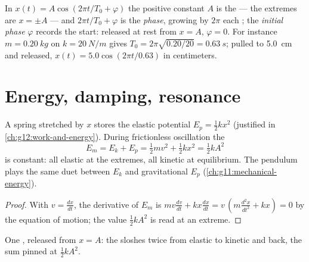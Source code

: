 \begin{definition}\label{def:g12:oscillators-and-time:phase}
In $x(t) = A\cos(2\pi t/T_0 + \varphi)$ the positive constant $A$ is
the  --- the extremes are $x = \pm A$ --- and $2\pi t/T_0 +
\varphi$ is the \emph{phase}, growing by $2\pi$ each
; the \emph{initial phase} $\varphi$
records the start: released at rest from $x = A$, $\varphi = 0$. For
instance $m = \qty{0.20}{kg}$ on $k = \qty{20}{N/m}$ gives $T_0 =
2\pi\sqrt{0.20/20} = \qty{0.63}{s}$; pulled to \qty{5.0}{cm} and
released, $x(t) = 5.0\cos(2\pi t/0.63)$ in centimeters.
\end{definition}

\section{Energy, damping, resonance}

\begin{proposition}\label{prop:g12:oscillators-and-time:energy}
A spring stretched by $x$ stores the elastic potential  $E_p =
\tfrac12 kx^2$ (justified in \cref{ch:g12:work-and-energy}). During
frictionless oscillation the 
\[
E_m = E_k + E_p = \tfrac12 m v^2 + \tfrac12 k x^2 = \tfrac12 k A^2
\]
is constant: all elastic at the extremes, all kinetic at equilibrium.
The pendulum plays the same duet between $E_k$ and gravitational
$E_p$ (\cref{ch:g11:mechanical-energy}).
\end{proposition}

\begin{proof}
With $v = \frac{dx}{dt}$, the derivative of $E_m$ is $mv\frac{dv}{dt}
+ kx\frac{dx}{dt} = v\,(m\frac{d^2x}{dt^2} + kx) = 0$ by the equation
of motion; the value $\tfrac12 kA^2$ is read at an extreme.
\end{proof}

\begin{omfigure}

{\small One , released from $x = A$: the  sloshes twice
from elastic to kinetic and back, the sum pinned at $\tfrac12 kA^2$.}
\end{omfigure}

